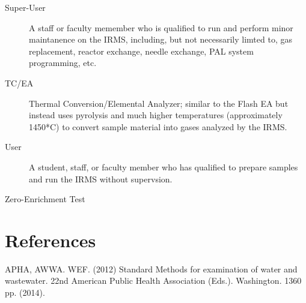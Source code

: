 \documentclass[12pt]{../SOP4_alpha}\usepackage[]{graphicx}\usepackage[]{color}
\begin{document}
\begin{description}
\item[Super-User] \label{Super-User} A staff or faculty memember who is qualified to run and perform minor maintanence on the IRMS, including, but not necessarily limted to, gas replacement, reactor exchange, needle exchange, PAL system programming, etc.  

\item[TC/EA] Thermal Conversion/Elemental Analyzer; similar to the Flash EA but instead uses pyrolysis and much higher temperatures (approximately 1450*C) to convert sample material into gases analyzed by the IRMS.

\item[User] A student, staff, or faculty member who has qualified to prepare samples and run the IRMS without supervsion.

\item[Zero-Enrichment Test]

\end{description}


\section{References}

\NP APHA, AWWA. WEF. (2012) Standard Methods for examination of water and wastewater. 22nd American Public Health Association (Eds.). Washington. 1360 pp. (2014).
\end{document}
